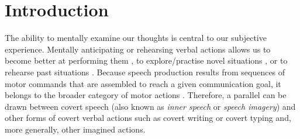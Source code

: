 \documentclass[utf8]{template/frontiersSCNS} %
\begin{document}
\newpage

\section{Introduction}



The ability to mentally examine our thoughts is central to our subjective experience. Mentally anticipating or rehearsing verbal actions allows us to become better at performing them \citep[e.g.,][]{toth_does_2020}, to explore/practise novel situations \citep{babar}, or to rehearse past situations \citep{babar}. Because speech production results from sequences of motor commands that are assembled to reach a given communication goal, it belongs to the broader category of motor actions \citep{jeannerod_motor_2006}. Therefore, a parallel can be drawn between covert speech (also known as \textit{inner speech} or \textit{speech imagery}) \citep[for reviews, see][]{alderson-day_inner_2015, perrone-bertolotti_what_2014, loevenbruck_cognitive_2018} and other forms of covert verbal actions such as covert writing or covert typing and, more generally, other imagined actions.
\end{document}
